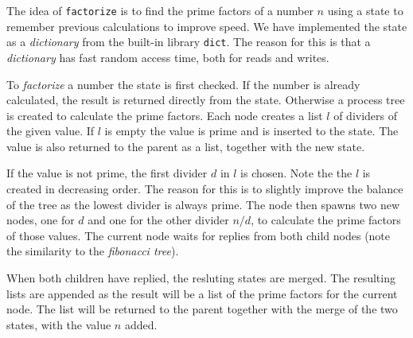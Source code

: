 \documentclass[a4paper,11pt]{article}
\begin{document}
The idea of \texttt{factorize} is to find the prime factors of a number $n$ using a state to remember previous calculations to improve speed. We have implemented the state as a \emph{dictionary} from the built-in library \texttt{dict}. The reason for this is that a \emph{dictionary} has fast random access time, both for reads and writes.

To \emph{factorize} a number the state is first checked. If the number is already calculated, the result is returned directly from the state. Otherwise a process tree is created to calculate the prime factors. Each node creates a list $l$ of dividers of the given value. If $l$ is empty the value is prime and is inserted to the state. The value is also returned to the parent as a list, together with the new state.

If the value is not prime, the first divider $d$ in $l$ is chosen. Note the the $l$ is created in decreasing order. The reason for this is to slightly improve the balance of the tree as the lowest divider is always prime. The node then spawns two new nodes, one for $d$ and one for the other divider $n / d$, to calculate the prime factors of those values. The current node waits for replies from both child nodes (note the similarity to the \emph{fibonacci tree}).

When both children have replied, the resluting states are merged. The resulting lists are appended as the result will be a list of the prime factors for the current node. The list will be returned to the parent together with the merge of the two states, with the value $n$ added.
\end{document}
